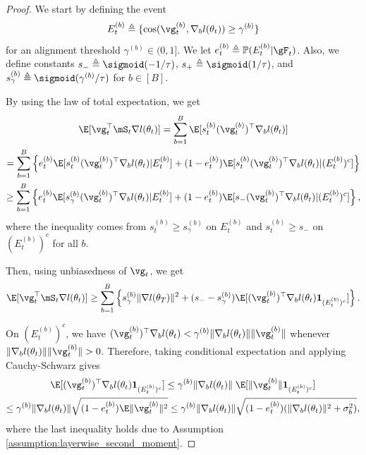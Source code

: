 \documentclass[11pt, a4paper, twocolumn, copyright, goog]{google}
\theoremstyle{plain}
\theoremstyle{definition}
\theoremstyle{remark}
\begin{document}
\begin{proof}
    We start by defining the event
    \begin{equation}
        E_t^{(b)} \triangleq \{ \text{cos}(\vg_t^{(b)}, \nabla_b l(\theta_t)) \geq \gamma^{(b)} \}
    \end{equation} for an alignment threshold $\gamma^{(b)} \in (0, 1]$.
    We let $e_t^{(b)} \triangleq \mathbb{P}(E_t^{(b)} | \gF_t)$. Also, we define constants $s_- \triangleq \sigmoid(- 1 / \tau)$, $s_+ \triangleq \sigmoid(1 / \tau)$, and $s_{\gamma}^{(b)} \triangleq \sigmoid(\gamma^{(b)} / \tau)$ for $b \in [B]$. 

    By using the law of total expectation, we get
    \begin{multline} \label{intem1}
        \E [\vg_t^\top \mS_t \nabla l(\theta_t)] 
            = \sum_{b=1}^{B} \E [s_t^{(b)} (\vg_t^{(b)})^\top \nabla_b l(\theta_t)] \\ 
            = \sum_{b=1}^{B}  \left\lbrace e_t^{(b)} \E [s_t^{(b)} (\vg_t^{(b)})^\top \nabla_b l(\theta_t) | E_t^{(b)}] + (1-e_t^{(b)}) \E [s_t^{(b)} (\vg_t^{(b)})^\top \nabla_b l(\theta_t) | (E_{t}^{(b)})^c] \right\rbrace \\
            \geq \sum_{b=1}^{B}  \left\lbrace e_t^{(b)} \E [s_{\gamma}^{(b)} (\vg_t^{(b)})^\top \nabla_b l(\theta_t) | E_t^{(b)}] + (1-e_t^{(b)}) \E [s_- (\vg_t^{(b)})^\top \nabla_b l(\theta_t) | (E_{t}^{(b)})^c] \right\rbrace,
    \end{multline}
    where the inequality comes from $s_t^{(b)} \geq s_{\gamma}^{(b)}$ on $E_t^{(b)}$ and $s_t^{(b)} \geq s_-$ on $(E_{t}^{(b)})^c$ for all $b$. 
    
    Then, using unbiasedness of $\vg_t$, we get 
    \begin{equation} 
        \E [\vg_t^\top \mS_t  \nabla l(\theta_t)] 
            \ge \sum_{b=1}^{B} \left\lbrace s_{\gamma}^{(b)} \| \nabla l (\theta_T) \|^2 +  (s_- - s_{\gamma}^{(b)}) \E [(\vg_t^{(b)})^\top \nabla_b l(\theta_t) \mathbf{1}_{(E_{t}^{(b)})^c}] \right\rbrace.
    \end{equation}
    
    On $(E_{t}^{(b)})^c$, we have $(\vg_t^{(b)})^\top \nabla_b l(\theta_t) < \gamma^{(b)} \| \nabla_b l(\theta_t) \| \| \vg_t^{(b)} \|$ whenever $ \| \nabla_b l(\theta_t) \| \| \vg_t^{(b)} \| > 0$. Therefore, taking conditional expectation and applying Cauchy-Schwarz gives
    \begin{multline} \label{intem2}
        \E [(\vg_t^{(b)})^\top \nabla_b l(\theta_t) \mathbf{1}_{(E_{t}^{(b)})^c}]
            \le \gamma^{(b)} \| \nabla_b l(\theta_t) \| \; \E [\|\vg_t^{(b)} \| \mathbf{1}_{(E_{t}^{(b)})^c} ] \\
            \le \gamma^{(b)} \| \nabla_b l(\theta_t) \| \sqrt{(1 - e_t^{(b)}) \E \|\vg_t^{(b)} \|^2}  
            \le \gamma^{(b)} \| \nabla_b l(\theta_t) \| \sqrt{(1 - e_t^{(b)}) (\|\nabla_b l(\theta_t) \|^2 + \sigma^2_b)},
    \end{multline}
    where the last inequality holds due to Assumption \ref{assumption:layerwise_second_moment}.
    

\end{proof}
\end{document}
